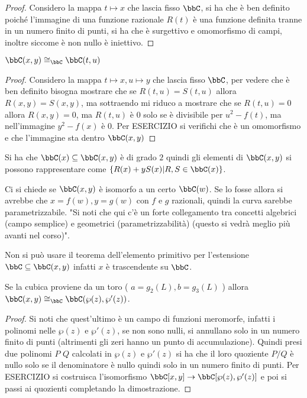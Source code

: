 \begin{proof}
Considero la mappa $t\mapsto x$ che lascia fisso $\bbC$, si ha che è ben definito poiché l'immagine di una funzione razionale $R(t)$ è una funzione definita tranne in un numero finito di punti, si ha che è surgettivo e omomorfismo di campi, inoltre siccome è non nullo è iniettivo.
\end{proof}

\begin{proposizione}
$\bbC(x,y)\cong_{\bbC}\bbC(t,u)$
\end{proposizione}

\begin{proof}
Considero la mappa $t\mapsto x, u\mapsto y$ che lascia fisso $\bbC$, per vedere che è ben definito bisogna mostrare che se $R(t,u)=S(t,u)$ allora $R(x,y)=S(x,y)$, ma sottraendo mi riduco a mostrare che se $R(t,u)=0$ allora $R(x,y)=0$, ma $R(t,u)$ è $0$ solo se è divisibile per $u^2-f(t)$, ma nell'immagine $y^2-f(x)$ è $0$. Per ESERCIZIO si verifichi che è un omomorfismo e che l'immagine sta dentro $\bbC(x,y)$
\end{proof}

\begin{osservazione}
Si ha che $\bbC(x)\subseteq\bbC(x,y)$ è di grado $2$ quindi gli elementi di $\bbC(x,y)$ si possono rappresentare come $\{ R(x)+y S(x) | R,S \in \bbC(x)\}$.
\end{osservazione}

Ci si chiede se $\bbC(x,y)$ è isomorfo a un certo $\bbC(w)$.
Se lo fosse allora si avrebbe che $x=f(w), y=g(w)$ con $f$ e $g$ razionali, quindi la curva sarebbe parametrizzabile. "Si noti che qui c'è un forte collegamento tra concetti algebrici (campo semplice) e geometrici (parametrizzabilità) (questo si vedrà meglio più avanti nel corso)".

\begin{osservazione}
Non si può usare il teorema dell'elemento primitivo per l'estensione $\bbC\subseteq\bbC(x,y)$ infatti $x$ è trascendente su $\bbC$.
\end{osservazione}

\begin{proposizione}Se la cubica proviene da un toro ( $a=g_2(L), b=g_3(L)$ ) allora $\bbC(x,y)\cong_{\bbC}\bbC(\wp(z),\wp'(z))$.
\end{proposizione}

\begin{proof}
Si noti che quest'ultimo è un campo di funzioni meromorfe, infatti i polinomi nelle $\wp(z)$ e $\wp'(z)$, se non sono nulli, si annullano solo in un numero finito di punti (altrimenti gli zeri hanno un punto di accumulazione). Quindi presi due polinomi $P$ $Q$ calcolati in $\wp(z)$ e $\wp'(z)$ si ha che il loro quoziente $P/Q$ è nullo solo se il denominatore è nullo quindi solo in un numero finito di punti. Per ESERCIZIO si costruisca l'isomorfismo $\bbC[x,y]\rightarrow\bbC[\wp(z),\wp'(z)]$ e poi si passi ai quozienti completando la dimostrazione.
\end{proof}


